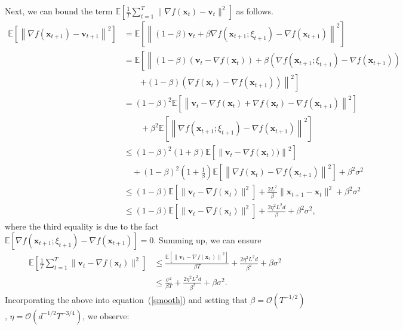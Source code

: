 \documentclass{article}
\newcommand{\E}{\mathbb{E}}
\newcommand{\Norm}[1]{\left\|#1\right\|}
\def \E {\mathbb{E}}
\def \v {\mathbf{v}}
\def \x {\mathbf{x}}
\def \E {\mathbb{E}}
\def \x {\mathbf{x}}
\def \v {\mathbf{v}}
\begin{document}
Next, we can bound the term $\E\left[\frac{1}{T}\sum_{t=1}^{T} \|\nabla f(\x_t) - \v_t\|^2\right]$ as follows.
\begin{align*}
        \E\left[\Norm{\nabla f(\x_{t+1}) -\v_{t+1}}^2\right] &= \E\left[\Norm{(1-\beta)\v_{t} + \beta \nabla f(\x_{t+1};\xi_{t+1})  - \nabla f(\x_{t+1})}^2\right]\\
        & = \E\left[\left\|(1-\beta)(\v_{t} - \nabla f(\x_{t})) + \beta \left(\nabla f(\x_{t+1};\xi_{t+1}) - \nabla f(\x_{t+1})  \right)  \right.\right. \\
        & \qquad \left.\left.  + (1-\beta)\left(\nabla f(\x_{t})-\nabla f(\x_{t+1}) \right)\right\|^2 \right]\\
        & = (1-\beta)^2 \E\left[\left\|\v_{t} - \nabla f(\x_{t})+\nabla f(\x_{t}) - \nabla f(\x_{t+1})\right\|^2\right] \\
        & \qquad + \beta^2 \E\left[\left\|\nabla f(\x_{t+1};\xi_{t+1}) - \nabla f(\x_{t+1})\right\|^2\right] \\
        & \leq (1-\beta)^2 (1+\beta)\E\left[\left\|\v_{t} - \nabla f(\x_{t}))\right\|^2\right] \\
        &\quad +(1-\beta)^2(1+\frac{1}{\beta}) \E\left[\left\|\nabla f(\x_{t}) - \nabla f(\x_{t+1})\right\|^2\right] + \beta^2 \sigma^2 \\
        & \leq  (1-\beta)\E\left[\|\v_{t} - \nabla f(\x_{t})\|^2\right]   + \frac{2L^2}{\beta} \|\x_{t+1} - \x_{t} \|^2+ \beta^2\sigma^2 \\
        & \leq  (1-\beta)\E\left[\|\v_{t} - \nabla f(\x_{t})\|^2\right]   + \frac{2\eta^2L^2d}{\beta}+ \beta^2\sigma^2,
\end{align*}
where the third equality is due to the fact $\E\left[\nabla f(\x_{t+1};\xi_{t+1}) - \nabla f(\x_{t+1}) \right]=0$. Summing up, we can ensure
\begin{equation}\label{red}
    \begin{aligned}
     \E\left[\frac{1}{T}\sum_{t=1}^T \|\v_t - \nabla f(\x_t)\|^2\right] &\leq \frac{\E\left[\Norm{\v_1-\nabla f(\x_1)}^2\right]}{\beta T}  + \frac{2\eta^2 L^2  d}{\beta^2}+ \beta\sigma^2\\
     &\leq \frac{\sigma^2}{\beta T}  + \frac{2\eta^2 L^2  d}{\beta^2}+ \beta\sigma^2.
\end{aligned}
\end{equation}
Incorporating the above into equation~(\ref{smooth}) and setting that $\beta = \mathcal{O}\left( T^{-1/2}\right)$, $\eta = \mathcal{O}\left( d^{-1/2}T^{-3/4}\right)$, we observe:
\end{document}
